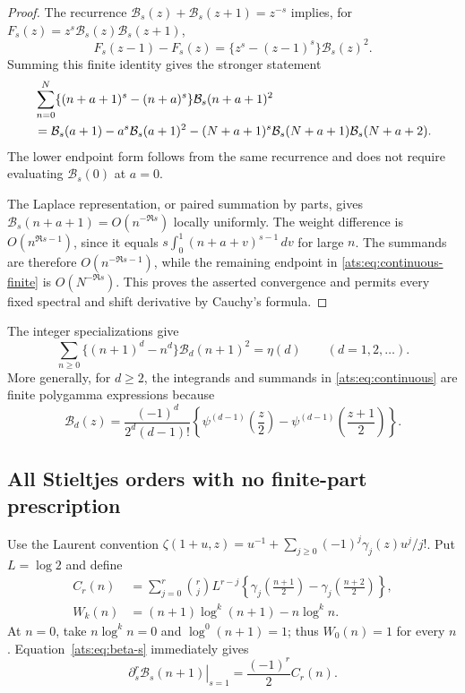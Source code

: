 \begin{proof}
The recurrence
$\mathcal B_s(z)+\mathcal B_s(z+1)=z^{-s}$ implies, for
$F_s(z)=z^s\mathcal B_s(z)\mathcal B_s(z+1)$,
\[
 F_s(z-1)-F_s(z)=\{z^s-(z-1)^s\}\mathcal B_s(z)^2.
\]
Summing this finite identity gives the stronger statement
\begin{align}\label{ats:eq:continuous-finite}
 &\sum_{n=0}^{N}\{(n+a+1)^s-(n+a)^s\}
                          \mathcal B_s(n+a+1)^2\notag\\
 &=\mathcal B_s(a+1)-a^s\mathcal B_s(a+1)^2
 -(N+a+1)^s\mathcal B_s(N+a+1)\mathcal B_s(N+a+2).
\end{align}
The lower endpoint form follows from the same recurrence and does
not require evaluating $\mathcal B_s(0)$ at $a=0$.

The Laplace representation, or paired summation by parts, gives
$\mathcal B_s(n+a+1)=O(n^{-\Re s})$ locally uniformly. The weight
difference is $O(n^{\Re s-1})$, since it equals
$s\int_0^1(n+a+v)^{s-1}\,dv$ for large $n$.
The summands are therefore $O(n^{-\Re s-1})$, while the remaining
endpoint in \eqref{ats:eq:continuous-finite} is $O(N^{-\Re s})$.
This proves the asserted convergence and permits every fixed
spectral and shift derivative by Cauchy's formula.
\end{proof}

The integer specializations give
\[
 \sum_{n\ge0}\{(n+1)^d-n^d\}\mathcal B_d(n+1)^2=\eta(d)
 \qquad(d=1,2,\ldots).
\]
More generally, for $d\ge2$, the integrands and summands in
\eqref{ats:eq:continuous} are finite polygamma expressions because
\[
 \mathcal B_d(z)=
 \frac{(-1)^d}{2^d(d-1)!}
 \left\{\psi^{(d-1)}\left(\frac z2\right)
       -\psi^{(d-1)}\left(\frac{z+1}{2}\right)\right\}.
\]

\subsection{All Stieltjes orders with no finite-part prescription}

Use the Laurent convention
$\zeta(1+u,z)=u^{-1}+\sum_{j\ge0}(-1)^j\gamma_j(z)u^j/j!$.
Put $L=\log2$ and define
\begin{align*}
 C_r(n)&=\sum_{j=0}^{r}\binom rj L^{r-j}
 \left\{\gamma_j\left(\frac{n+1}{2}\right)
       -\gamma_j\left(\frac{n+2}{2}\right)\right\},\\
 W_k(n)&=(n+1)\log^k(n+1)-n\log^k n.
\end{align*}
At $n=0$, take $n\log^k n=0$ and $\log^0(n+1)=1$;
thus $W_0(n)=1$ for every $n$. Equation~\eqref{ats:eq:beta-s}
immediately gives
\[
 \left.\partial_s^r\mathcal B_s(n+1)\right|_{s=1}
       =\frac{(-1)^r}{2}C_r(n).
\]


